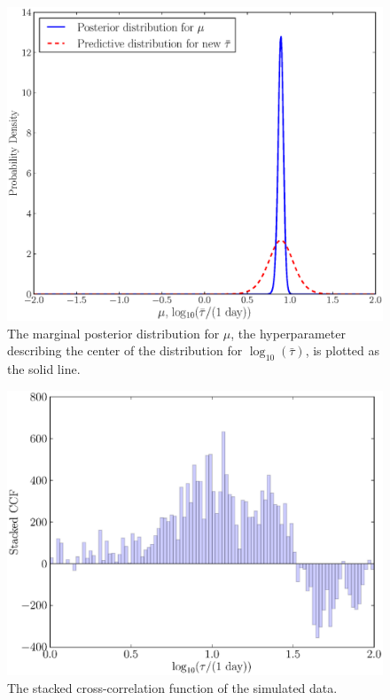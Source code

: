 \documentclass[useAMS,usenatbib]{mn2e}
\begin{document}
\begin{figure}
\begin{center}
\includegraphics[scale=0.35]{Figures/posterior2.eps}
\caption{The marginal posterior distribution for $\mu$, the 
hyperparameter describing the center of the distribution for
$\log_{10}\left(\bar{\tau}\right)$, is plotted as the solid line.
\label{fig:posterior2}}
\end{center}
\end{figure}

\begin{figure}
\begin{center}
\includegraphics[scale=0.4]{Figures/ccf.eps}
\caption{The stacked cross-correlation function of the simulated data.
\label{fig:ccf}}
\end{center}
\end{figure}
\end{document}

